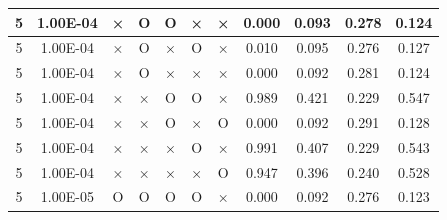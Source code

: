 \documentclass[11pt]{article}
\begin{document}
\begin{longtable}[h]{|r|r|l|l|l|l|l|r|r|l|r|}
\multicolumn{1}{|c|}{5} & \multicolumn{1}{c|}{1.00E-04} & \multicolumn{1}{c|}{×} & \multicolumn{1}{c|}{O} & \multicolumn{1}{c|}{O} & \multicolumn{1}{c|}{×} & \multicolumn{1}{c|}{×} & \multicolumn{1}{c|}{0.000} & \multicolumn{1}{c|}{0.093} & \multicolumn{1}{c|}{0.278} & \multicolumn{1}{c|}{0.124} \\ \hline
\multicolumn{1}{|c|}{5} & \multicolumn{1}{c|}{1.00E-04} & \multicolumn{1}{c|}{×} & \multicolumn{1}{c|}{O} & \multicolumn{1}{c|}{×} & \multicolumn{1}{c|}{O} & \multicolumn{1}{c|}{×} & \multicolumn{1}{c|}{0.010} & \multicolumn{1}{c|}{0.095} & \multicolumn{1}{c|}{0.276} & \multicolumn{1}{c|}{0.127} \\ \hline
\multicolumn{1}{|c|}{5} & \multicolumn{1}{c|}{1.00E-04} & \multicolumn{1}{c|}{×} & \multicolumn{1}{c|}{O} & \multicolumn{1}{c|}{×} & \multicolumn{1}{c|}{×} & \multicolumn{1}{c|}{×} & \multicolumn{1}{c|}{0.000} & \multicolumn{1}{c|}{0.092} & \multicolumn{1}{c|}{0.281} & \multicolumn{1}{c|}{0.124} \\ \hline
\multicolumn{1}{|c|}{5} & \multicolumn{1}{c|}{1.00E-04} & \multicolumn{1}{c|}{×} & \multicolumn{1}{c|}{×} & \multicolumn{1}{c|}{O} & \multicolumn{1}{c|}{O} & \multicolumn{1}{c|}{×} & \multicolumn{1}{c|}{0.989} & \multicolumn{1}{c|}{0.421} & \multicolumn{1}{c|}{0.229} & \multicolumn{1}{c|}{0.547} \\ \hline
\multicolumn{1}{|c|}{5} & \multicolumn{1}{c|}{1.00E-04} & \multicolumn{1}{c|}{×} & \multicolumn{1}{c|}{×} & \multicolumn{1}{c|}{O} & \multicolumn{1}{c|}{×} & \multicolumn{1}{c|}{O} & \multicolumn{1}{c|}{0.000} & \multicolumn{1}{c|}{0.092} & \multicolumn{1}{c|}{0.291} & \multicolumn{1}{c|}{0.128} \\ \hline
\multicolumn{1}{|c|}{5} & \multicolumn{1}{c|}{1.00E-04} & \multicolumn{1}{c|}{×} & \multicolumn{1}{c|}{×} & \multicolumn{1}{c|}{×} & \multicolumn{1}{c|}{O} & \multicolumn{1}{c|}{×} & \multicolumn{1}{c|}{0.991} & \multicolumn{1}{c|}{0.407} & \multicolumn{1}{c|}{0.229} & \multicolumn{1}{c|}{0.543} \\ \hline
\multicolumn{1}{|c|}{5} & \multicolumn{1}{c|}{1.00E-04} & \multicolumn{1}{c|}{×} & \multicolumn{1}{c|}{×} & \multicolumn{1}{c|}{×} & \multicolumn{1}{c|}{×} & \multicolumn{1}{c|}{O} & \multicolumn{1}{c|}{0.947} & \multicolumn{1}{c|}{0.396} & \multicolumn{1}{c|}{0.240} & \multicolumn{1}{c|}{0.528} \\ \hline
\multicolumn{1}{|c|}{5} & \multicolumn{1}{c|}{1.00E-05} & \multicolumn{1}{c|}{O} & \multicolumn{1}{c|}{O} & \multicolumn{1}{c|}{O} & \multicolumn{1}{c|}{O} & \multicolumn{1}{c|}{×} & \multicolumn{1}{c|}{0.000} & \multicolumn{1}{c|}{0.092} & \multicolumn{1}{c|}{0.276} & \multicolumn{1}{c|}{0.123} \\ \hline

\end{longtable}
\end{document}
